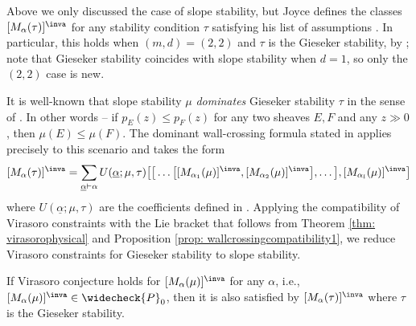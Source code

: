 Above we only discussed the case of slope stability, but Joyce defines the classes $[M_{\alpha}(\tau)]^{\inva}$ for any stability condition $\tau$ satisfying his list of assumptions \cite[Assumption 5.1 and 5.2]{Jo21}. In particular, this holds when $(m,d) = (2,2)$ and $\tau$ is the Gieseker stability, by \cite[Section 7]{Jo21}; note that Gieseker stability coincides with slope stability when $d=1$, so only the $(2,2)$ case is new.

It is well-known that slope stability $\mu$ \textit{dominates} Gieseker stability $\tau$ in the sense of \cite[Definition 3.8]{Jo21}.  In other words -- if $p_E(z)\leq p_F(z)$ for any two sheaves $E,F$ and any $z\gg 0$, then $\mu(E)\leq \mu(F)$. The dominant wall-crossing formula stated in \cite[Theorem 5.8, Theorem 7.64]{Jo21} applies precisely to this scenario and takes the form
$$
[M_{\alpha}(\tau)]^\inva=\sum_{\underline{\alpha}\vdash \alpha
}U(\underline{\alpha};\mu,\tau)
\big[\big[\ldots  \big[ [M_{\alpha_1}(\mu)]^\inva,[M_{\alpha_2}(\mu)]^\inva \big],\ldots \big ],[M_{\alpha_l}(\mu)]^\inva \big]
$$
where $U(\underline{\alpha};\mu,\tau)$ are the coefficients defined in  \cite[Section 3.2]{Jo21}.  Applying the compatibility of Virasoro constraints with the Lie bracket that follows from Theorem \ref{thm: virasorophysical} and Proposition \ref{prop: wallcrossingcompatibility1}, we reduce Virasoro constraints for Gieseker stability to slope stability.
\begin{corollary}
\notready
\label{cor:slopetogies}
    If Virasoro conjecture holds for $[M_{\alpha}(\mu)]^{\inva}$ for any $\alpha$, i.e., $[M_{\alpha}(\mu)]^{\inva}\in \widecheck{P}_0$, then it is also satisfied by $[M_{\alpha}(\tau)]^{\inva}$ where $\tau$ is the Gieseker stability.
\end{corollary}


